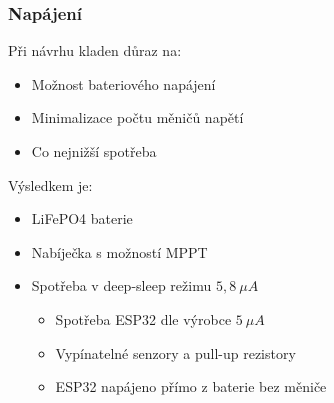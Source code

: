 \documentclass[%
  12pt,       				%
	t,                  %
	aspectratio=1610,   %
	unicode,						%
]{beamer}				    	%
\begin{document}
\begin{frame}
	\frametitle{Napájení}

	\vspace{1ex}
	Při návrhu kladen důraz na:
	\begin{itemize}
		\item Možnost bateriového napájení
		\item Minimalizace počtu měničů napětí
		\item Co nejnižší spotřeba
	\end{itemize}

	\vspace{1.5ex}
	Výsledkem je:
	\begin{itemize}
		\item LiFePO4 baterie
		\item Nabíječka s možností MPPT
		\item Spotřeba v deep-sleep režimu $5,8~\mu A$
		\begin{itemize}
			\item Spotřeba ESP32 dle výrobce $5~\mu A$
			\item Vypínatelné senzory a pull-up rezistory
			\item ESP32 napájeno přímo z baterie bez měniče
		\end{itemize}
	\end{itemize}


\end{frame}



\end{document}

